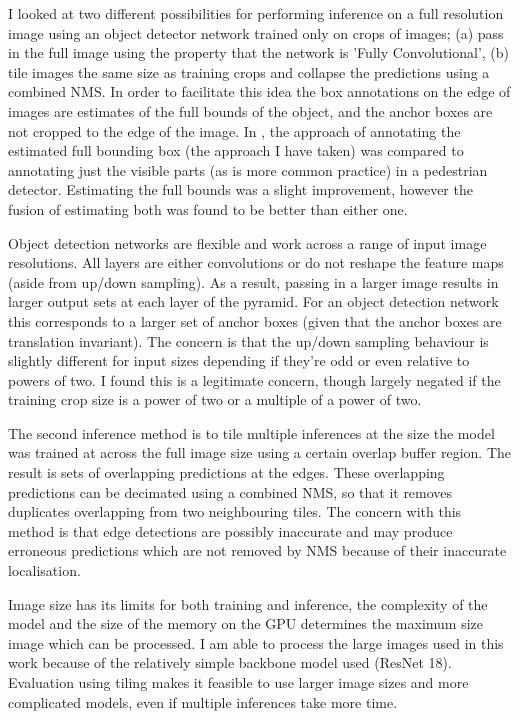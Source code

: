 I looked at two different possibilities for performing inference on a full resolution image using an object detector network trained only on crops of images; (a) pass in the full image using the property that the network is 'Fully Convolutional', (b) tile images the same size as training crops and collapse the predictions using a combined \gls{NMS}. In order to facilitate this idea the box annotations on the edge of images are estimates of the full bounds of the object, and the anchor boxes are not cropped to the edge of the image. In \cite{Duarte2010}, the approach of annotating the estimated full bounding box (the approach I have taken) was compared to annotating just the visible parts (as is more common practice) in a pedestrian detector. Estimating the full bounds was a slight improvement, however the fusion of estimating both was found to be better than either one. 

Object detection networks are flexible and work across a range of input image resolutions. All layers are either convolutions or do not reshape the feature maps (aside from up/down sampling). As a result, passing in a larger image results in larger output sets at each layer of the pyramid. For an object detection network this corresponds to a larger set of anchor boxes (given that the anchor boxes are translation invariant). The concern is that the up/down sampling behaviour is slightly different for input sizes depending if they're odd or even relative to powers of two. I found this is a legitimate concern, though largely negated if the training crop size is a power of two or a multiple of a power of two. 

The second inference method is to tile multiple inferences at the size the model was trained at across the full image size using a certain overlap buffer region. The result is sets of overlapping predictions at the edges. These overlapping predictions can be decimated using a combined \gls{NMS}, so that it removes duplicates overlapping from two neighbouring tiles. The concern with this method is that edge detections are possibly inaccurate and may produce erroneous predictions which are not removed by \gls{NMS} because of their inaccurate localisation. 

Image size has its limits for both training and inference, the complexity of the model and the size of the memory on the \gls{GPU} determines the maximum size image which can be processed. I am able to process the large images used in this work because of the relatively simple backbone model used (ResNet 18). Evaluation using tiling makes it feasible to use larger image sizes and more complicated models, even if multiple inferences take more time.


